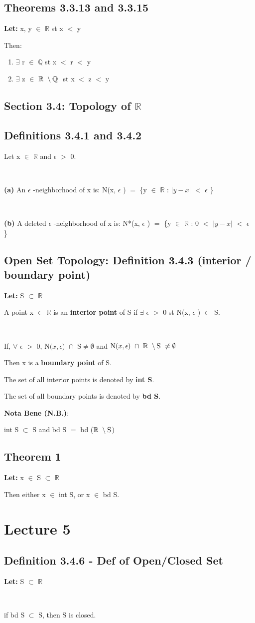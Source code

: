 \documentclass{article}
\newcommand{\mt}[1]{\ensuremath{#1}}
\newcommand\bsc[2][\DefaultOpt]{%
  \def\DefaultOpt{#2}%
  \section[#1]{#2}%
}
\newcommand\ssc[2][\DefaultOpt]{%
  \def\DefaultOpt{#2}%
  \subsection[#1]{#2}%
}
\newcommand{\balist}{\begin{enumerate}[label=\alph*.]}
\newcommand{\elist}{\end{enumerate}}
\newcommand{\lt}[1]{\textbf{Let: } #1}
\newcommand{\bpth}[1]{\textbf{(#1)}}
\newcommand{\br}{\mt{\mathbb{R}} }       %
\newcommand{\bq}{\mt{\mathbb{Q}} }       %
\newcommand{\ep}{\mt{\epsilon} }         %
\newcommand{\fa}{\mt{\forall} }          %
\newcommand{\mem}{\mt{\in} }
\newcommand{\exs}{\mt{\exists} }
\newcommand{\sbs}{\mt{\subset} }         %
\newcommand{\eql}{\mt{=} }
\newcommand{\bnt}[2]{\mt{\textrm{#1}\setminus{\textrm{#2}}}}
\newcommand{\nbho}[3]{\textrm{N(}#1, #2\textrm{) }\cap \textrm{ #3} \neq \emptyset}
\begin{document}
{{\ssc{Theorems 3.3.13 and 3.3.15}{

\lt{x, y \mem \br st x $<$ y}

Then:

\balist
\item \exs r \mem \bq st x $<$ r $<$ y
\item \exs z \mem \bnt{\br}{\bq} st x $<$ z $<$ y
\elist

}

\ssc{Section 3.4: Topology of \br}{}

\ssc{Definitions 3.4.1 and 3.4.2}{

Let x \mem \br and \ep $>$ 0. \

\

\bpth{a} An \ep-neighborhood of x is: N(x, \ep) \eql \{y \mem \br: $|y - x|$ $<$ \ep\}

\

\bpth{b} A deleted \ep-neighborhood of x is: N*(x, \ep) \eql \{y \mem \br: 0 $<$ $|y - x|$ $<$ \ep\} \
}

\ssc{Open Set Topology: Definition 3.4.3 (interior / boundary point)}{

\lt{S \sbs \br}

A point x \mem \br is an \textbf{interior point} of S if \exs \ep $>$ 0 st N(x, \ep) \sbs S. \

\

If, \fa \ep $>$ 0, $\nbho{x}{\ep}{S}$ and $\nbho{x}{\ep}{\bnt{\br}{S	}}$

Then x is a \textbf{boundary point} of S.

The set of all interior points is denoted by \textbf{int S}.

The set of all boundary points is denoted by \textbf{bd S}.

\textbf{Nota Bene (N.B.)}:

int S \sbs S and bd S \eql bd (\bnt{\br}{S})

}

\ssc{Theorem 1}{

\lt{x \mem S \sbs \br}

Then either x \mem int S, or x \mem bd S.

}

}

\newpage

\bsc{Lecture 5}{

\ssc{Definition 3.4.6 - Def of Open/Closed Set}{

\lt{S \sbs \br} \

\

	if bd S \sbs S, then S is closed.
	
}}}
\end{document}
